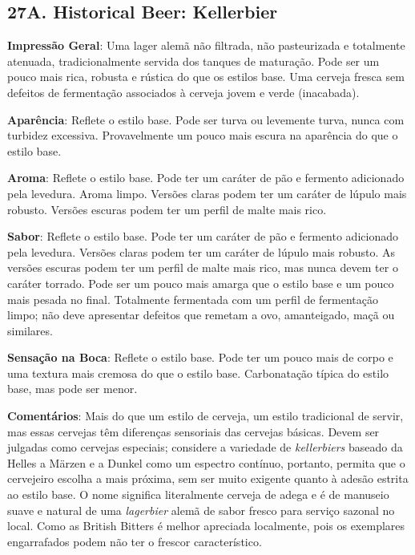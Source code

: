 \subsection*{27A. Historical Beer: Kellerbier}
\textbf{Impressão Geral}: Uma lager alemã não filtrada, não pasteurizada e totalmente atenuada, tradicionalmente servida dos tanques de maturação. Pode ser um pouco mais rica, robusta e rústica do que os estilos base. Uma cerveja fresca sem defeitos de fermentação associados à cerveja jovem e verde (inacabada).

\textbf{Aparência}: Reflete o estilo base. Pode ser turva ou levemente turva, nunca com turbidez excessiva. Provavelmente um pouco mais escura na aparência do que o estilo base.

\textbf{Aroma}: Reflete o estilo base. Pode ter um caráter de pão e fermento adicionado pela levedura. Aroma limpo. Versões claras podem ter um caráter de lúpulo mais robusto. Versões escuras podem ter um perfil de malte mais rico.

\textbf{Sabor}: Reflete o estilo base. Pode ter um caráter de pão e fermento adicionado pela levedura. Versões claras podem ter um caráter de lúpulo mais robusto. As versões escuras podem ter um perfil de malte mais rico, mas nunca devem ter o caráter torrado. Pode ser um pouco mais amarga que o estilo base e um pouco mais pesada no final. Totalmente fermentada com um perfil de fermentação limpo; não deve apresentar defeitos que remetam a ovo, amanteigado, maçã ou similares.

\textbf{Sensação na Boca}: Reflete o estilo base. Pode ter um pouco mais de corpo e uma textura mais cremosa do que o estilo base. Carbonatação típica do estilo base, mas pode ser menor.

\textbf{Comentários}: Mais do que um estilo de cerveja, um estilo tradicional de servir, mas essas cervejas têm diferenças sensoriais das cervejas básicas. Devem ser julgadas como cervejas especiais; considere a variedade de \textit{kellerbiers} baseado da Helles a Märzen e a Dunkel como um espectro contínuo, portanto, permita que o cervejeiro escolha a mais próxima, sem ser muito exigente quanto à adesão estrita ao estilo base. O nome significa literalmente cerveja de adega e é de manuseio suave e natural de uma \textit{lagerbier} alemã de sabor fresco para serviço sazonal no local. Como as British Bitters é melhor apreciada localmente, pois os exemplares engarrafados podem não ter o frescor característico.

